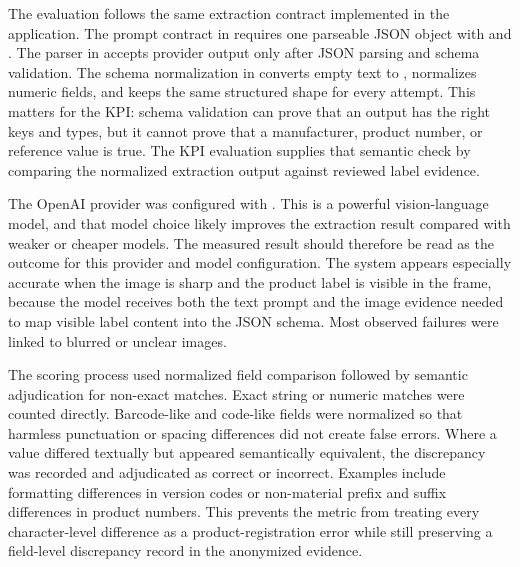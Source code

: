 The evaluation follows the same extraction contract implemented in the application. The prompt contract in  requires one parseable JSON object with  and . The parser in  accepts provider output only after JSON parsing and schema validation. The schema normalization in  converts empty text to , normalizes numeric fields, and keeps the same structured shape for every attempt. This matters for the KPI: schema validation can prove that an output has the right keys and types, but it cannot prove that a manufacturer, product number, or reference value is true. The KPI evaluation supplies that semantic check by comparing the normalized extraction output against reviewed label evidence.

The OpenAI provider was configured with . This is a powerful vision-language model, and that model choice likely improves the extraction result compared with weaker or cheaper models. The measured result should therefore be read as the outcome for this provider and model configuration. The system appears especially accurate when the image is sharp and the product label is visible in the frame, because the model receives both the text prompt and the image evidence needed to map visible label content into the JSON schema. Most observed failures were linked to blurred or unclear images.

The scoring process used normalized field comparison followed by semantic adjudication for non-exact matches. Exact string or numeric matches were counted directly. Barcode-like and code-like fields were normalized so that harmless punctuation or spacing differences did not create false errors. Where a value differed textually but appeared semantically equivalent, the discrepancy was recorded and adjudicated as correct or incorrect. Examples include formatting differences in version codes or non-material prefix and suffix differences in product numbers. This prevents the metric from treating every character-level difference as a product-registration error while still preserving a field-level discrepancy record in the anonymized evidence.

